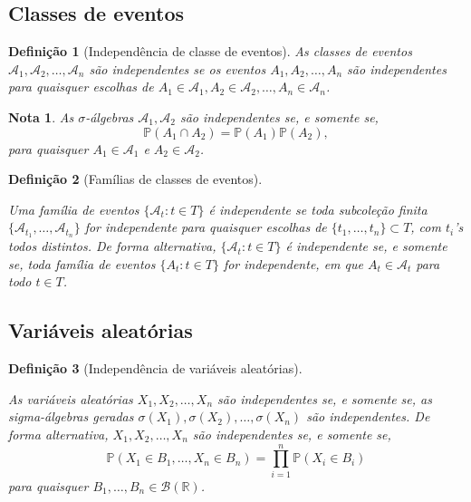 \documentclass[12pt,a4paper,answers]{article}
\numberwithin{equation}{section} %
\renewcommand{\Re}{\mathbb{R}}
\renewcommand{\P}{\mathbb{P}}
\newcommand{\Bo}{\mathcal{B}(\Re)} 				%
\newcommand{\Acal}{\mathcal{A}}
\theoremstyle{thm_estilo}
\newtheorem{definition}{Definição}[section]
\theoremstyle{thm_note_est}
\newtheorem*{note}{Nota}
\begin{document}
\subsection{Classes de eventos}

\begin{definition}[Independência de classe de eventos]
	As classes de eventos $\Acal_1, \Acal_2, \ldots, \Acal_n$ são independentes se os eventos $A_1, A_2, \ldots, A_n$ são independentes para quaisquer escolhas de $A_1\in\Acal_1, A_2\in\Acal_2, \ldots, A_n\in\Acal_n$.
\end{definition}
\begin{note}
	As $\sigma$-álgebras $\Acal_1, \Acal_2$ são independentes se, e somente se,
	\begin{equation}
		\P(A_1\cap A_2) = \P(A_1) \P(A_2),
	\end{equation}
	para quaisquer $A_1\in\Acal_1$ e $A_2\in\Acal_2$.
\end{note}


\begin{definition}[Famílias de classes de eventos]
	\leavevmode
	\begin{outline}
		\1 Uma família de eventos $\{\Acal_t: t \in T\}$ é independente se toda subcoleção finita $\{\Acal_{t_1}, \ldots, \Acal_{t_n}\}$ for independente para quaisquer escolhas de $\{t_1, \ldots, t_n\}\subset T$, com $t_i$'s todos distintos.
		\1 De forma alternativa, $\{\Acal_t: t \in T\}$ é independente se, e somente se, toda família de eventos $\{A_t: t \in T\}$ for independente, em que $A_t \in \Acal_t$ para todo $t \in T$.
	\end{outline}

\end{definition}

\subsection{Variáveis aleatórias}

\begin{definition}[Independência de variáveis aleatórias]
	\leavevmode
	\begin{outline}
		\1 As variáveis aleatórias $X_1, X_2, \ldots, X_n$ são independentes se, e somente se, as sigma-álgebras geradas $\sigma(X_1), \sigma(X_2), \ldots, \sigma(X_n)$ são independentes.
		\1 De forma alternativa, $X_1, X_2, \ldots, X_n$ são independentes se, e somente se,
		\begin{equation}
			\P(X_1\in B_1, \ldots, X_n \in B_n) = \prod_{i=1}^{n}\P(X_i \in B_i)
		\end{equation}
		para quaisquer $B_1, \ldots,B_n \in \Bo$.
	\end{outline}
\end{definition}
\end{document}
